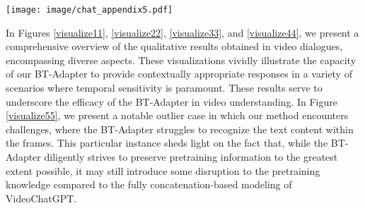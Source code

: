 \documentclass{article} \usepackage{iclr2024_conference,times}
\begin{document}
\begin{figure*}[!h] 
\centering
    \texttt{[image: image/chat\_appendix5.pdf]} 
    \vspace{-1.8em}
    \caption{The bad case of our method in video conversation. We present the answers from VideoChatGPT (upper) and our BT-Adapter-LLaVa (down).}
    \label{visualize55}
    \vspace{-0.2em}
\end{figure*}

In Figures \ref{visualize11}, \ref{visualize22}, \ref{visualize33}, and \ref{visualize44}, we present a comprehensive overview of the qualitative results obtained in video dialogues, encompassing diverse aspects. These visualizations vividly illustrate the capacity of our BT-Adapter to provide contextually appropriate responses in a variety of scenarios where temporal sensitivity is paramount. These results serve to underscore the efficacy of the BT-Adapter in video understanding. In Figure \ref{visualize55}, we present a notable outlier case in which our method encounters challenges, where the BT-Adapter struggles to recognize the text content within the frames. This particular instance sheds light on the fact that, while the BT-Adapter diligently strives to preserve pretraining information to the greatest extent possible, it may still introduce some disruption to the pretraining knowledge compared to the fully concatenation-based modeling of VideoChatGPT.
\end{document}
